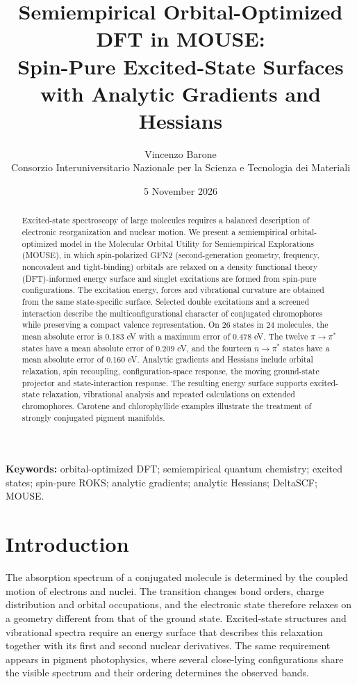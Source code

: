 \documentclass[11pt,a4paper]{article}
\title{Semiempirical Orbital-Optimized DFT in MOUSE:\\Spin-Pure Excited-State Surfaces with Analytic Gradients and Hessians}
\author{Vincenzo Barone\\\small Consorzio Interuniversitario Nazionale per la Scienza e Tecnologia dei Materiali}
\date{5 November 2026}
\begin{document}
\maketitle
\begin{abstract}
Excited-state spectroscopy of large molecules requires a balanced description
of electronic reorganization and nuclear motion. We present a semiempirical
orbital-optimized model in the Molecular Orbital Utility for Semiempirical
Explorations (MOUSE), in which spin-polarized GFN2 (second-generation
geometry, frequency, noncovalent and tight-binding) orbitals are
relaxed on a density functional theory (DFT)-informed energy surface and
singlet excitations are formed
from spin-pure configurations. The excitation energy, forces and vibrational
curvature are obtained from the same state-specific surface. Selected double
excitations and a screened interaction describe the multiconfigurational
character of conjugated chromophores while preserving a compact valence
representation. On 26 states in 24 molecules, the mean absolute error is
0.183 eV with a maximum error of 0.478 eV. The twelve $\pi\!\rightarrow\!\pi^*$
states have a mean absolute error of 0.209 eV, and the fourteen
$n\!\rightarrow\!\pi^*$ states have a mean absolute error of 0.160 eV.
Analytic gradients and Hessians include orbital relaxation, spin recoupling,
configuration-space response, the moving ground-state projector and
state-interaction response. The resulting energy surface supports excited-
state relaxation, vibrational analysis and repeated calculations on extended
chromophores. Carotene and chlorophyllide examples illustrate the treatment of
strongly conjugated pigment manifolds.
\end{abstract}
\noindent\textbf{Keywords:} orbital-optimized DFT; semiempirical quantum
chemistry; excited states; spin-pure ROKS; analytic gradients; analytic
Hessians; DeltaSCF; MOUSE.

\section{Introduction}
The absorption spectrum of a conjugated molecule is determined by the coupled
motion of electrons and nuclei. The transition changes bond orders, charge
distribution and orbital occupations, and the electronic state therefore
relaxes on a geometry different from that of the ground state. Excited-state
structures and vibrational spectra require an energy surface that describes
this relaxation together with its first and second nuclear derivatives. The
same requirement appears in pigment photophysics, where several close-lying
configurations share the visible spectrum and their ordering determines the
observed bands.
\end{document}
